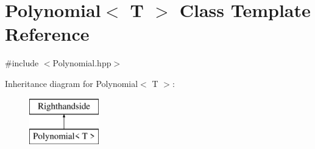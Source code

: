 \hypertarget{class_polynomial}{}\section{Polynomial$<$ T $>$ Class Template Reference}
\label{class_polynomial}


{\ttfamily \#include $<$Polynomial.\+hpp$>$}

Inheritance diagram for Polynomial$<$ T $>$\+:\begin{figure}[H]
\begin{center}
\leavevmode
\includegraphics[height=2.000000cm]{class_polynomial}
\end{center}
\end{figure}

